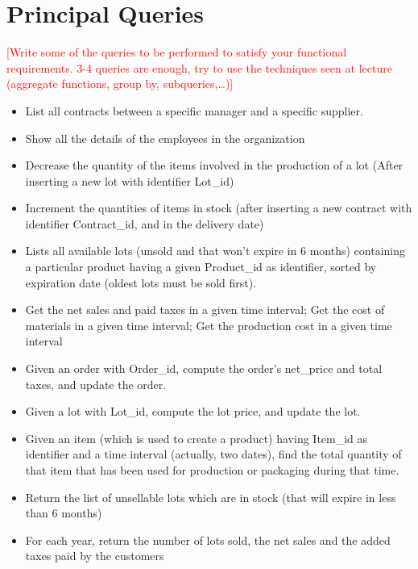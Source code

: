 \section{Principal Queries}
\textcolor{red}{[Write some of the queries to be performed to satisfy your functional requirements. 3-4 queries are enough, try to use the techniques seen at lecture (aggregate functions, group by, subqueries,…)]}



\begin{itemize}
    \item List all contracts between a specific manager and a specific supplier.
    \item Show all the details of the employees in the organization
    \item Decrease the quantity of the items involved in the production of a lot (After inserting a new lot with identifier Lot_id)
    \item Increment the quantities of items in stock (after inserting a new contract with identifier Contract_id, and in the delivery date)
    \item Lists all available lots (unsold and that won't expire in 6 months) containing a particular product having a given Product_id as identifier, sorted by expiration date (oldest lots must be sold first).
    \item Get the net sales and paid taxes in a given time interval; Get the cost of materials in a given time interval; Get the production cost in a given time interval
    \item Given an order with Order_id, compute the order's net_price and total taxes, and update the order.
    \item Given a lot with Lot_id, compute the lot price, and update the lot.
    \item Given an item (which is used to create a product) having Item_id as identifier and a time interval (actually, two dates), find the total quantity of that item that has been used for production or packaging during that time.
    \item Return the list of unsellable lots which are in stock (that will expire in less than 6 months)
    \item For each year, return the number of lots sold, the net sales and the added taxes paid by the customers
\end{itemize}


